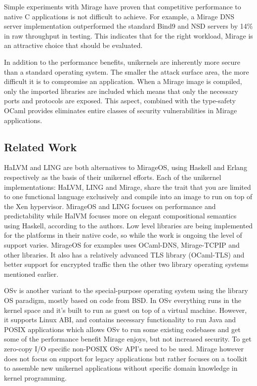 \documentclass[english,10pt,twocolumn]{article}
\begin{document}
Simple experiments with Mirage have proven that competitive performance to native C applications is not difficult to achieve.
For example, a Mirage DNS server implementation outperformed the standard Bind9 and NSD servers by 14\% in raw throughput in testing.
This indicates that for the right workload, Mirage is an attractive choice that should be evaluated.

In addition to the performance benefits, unikernels are inherently more secure than a standard operating system.
The smaller the attack surface area, the more difficult it is to compromise an application.
When a Mirage image is compiled, only the imported libraries are included which means that only the necessary ports and protocols are exposed.
This aspect, combined with the type-safety OCaml provides eliminates entire classes of security vulnerabilities in Mirage applications.


\subsection{Related Work}

HaLVM\cite{halvm} and LING\cite{ling} are both alternatives to MirageOS, using Haskell and Erlang respectively as the basis of their unikernel efforts.
Each of the unikernel implementations: HaLVM, LING and Mirage, share the trait that you are limited to one functional language exclusively and compile into an image to run on top of the Xen hypervisor.
MirageOS and LING focuses on performance and predictability while HalVM focuses more on elegant compositional semantics using Haskell, according to the authors\cite{tripreport}.
Low level libraries are being implemented for the platforms in their native code, so while the work is ongoing the level of support varies.
MirageOS for examples uses OCaml-DNS, Mirage-TCPIP and other libraries. It also has a relatively advanced TLS library (OCaml-TLS) and better support for encrypted traffic then the other two library operating systems mentioned earlier.

OSv\cite{osv} is another variant to the special-purpose operating system using the library OS paradigm, mostly based on code from BSD.
In OSv everything runs in the kernel space and it's built to run as guest on top of a virtual machine.
However, it supports Linux ABI, and contains necessary functionality to run Java and POSIX applications which allows OSv to run some existing codebases and get some of the performance benefit Mirage enjoys, but not increased security.
To get zero-copy I/O specific non-POSIX OSv API's need to be used.
Mirage however does not focus on support for legacy applications but rather focuses on a toolkit to assemble new unikernel applications without specific domain knowledge in kernel programming.
\end{document}
